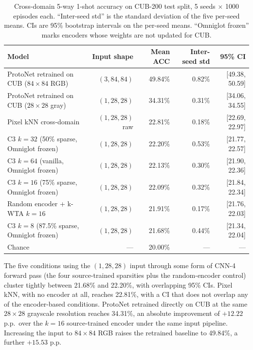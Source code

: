 \documentclass[11pt]{article}
\begin{document}
\begin{table}[tbp]
\centering
\small
\caption{Cross-domain 5-way 1-shot accuracy on CUB-200 test split, 5 seeds $\times$ 1000 episodes each. ``Inter-seed std'' is the standard deviation of the five per-seed means. CIs are 95\% bootstrap intervals on the per-seed means. ``Omniglot frozen'' marks encoders whose weights are not updated for CUB.}
\label{tab:main}
\begin{tabular}{lrrrr}
\toprule
Model & Input shape & Mean ACC & Inter-seed std & 95\% CI \\
\midrule
ProtoNet retrained on CUB ($84 \times 84$ RGB)            & $(3, 84, 84)$  & 49.84\% & 0.82\% & [49.38, 50.59] \\
ProtoNet retrained on CUB ($28 \times 28$ gray)           & $(1, 28, 28)$  & 34.31\% & 0.31\% & [34.06, 34.55] \\
Pixel kNN cross-domain                                    & $(1, 28, 28)$ raw & 22.81\% & 0.18\% & [22.69, 22.97] \\
C3 $k=32$ (50\% sparse, Omniglot frozen)                  & $(1, 28, 28)$  & 22.20\% & 0.53\% & [21.77, 22.57] \\
C3 $k=64$ (vanilla, Omniglot frozen)                      & $(1, 28, 28)$  & 22.13\% & 0.30\% & [21.90, 22.36] \\
C3 $k=16$ (75\% sparse, Omniglot frozen)                  & $(1, 28, 28)$  & 22.09\% & 0.32\% & [21.84, 22.34] \\
Random encoder + k-WTA $k=16$                             & $(1, 28, 28)$  & 21.91\% & 0.17\% & [21.76, 22.03] \\
C3 $k=8$ (87.5\% sparse, Omniglot frozen)                 & $(1, 28, 28)$  & 21.68\% & 0.44\% & [21.34, 22.04] \\
\midrule
Chance                                                    & ---            & 20.00\% & ---    & --- \\
\bottomrule
\end{tabular}
\end{table}

The five conditions using the $(1, 28, 28)$ input through some form of CNN-4 forward pass (the four source-trained sparsities plus the random-encoder control) cluster tightly between 21.68\% and 22.20\%, with overlapping 95\% CIs. Pixel kNN, with no encoder at all, reaches 22.81\%, with a CI that does not overlap any of the encoder-based conditions. ProtoNet retrained directly on CUB at the same $28 \times 28$ grayscale resolution reaches 34.31\%, an absolute improvement of $+12.22$ p.p.\ over the $k=16$ source-trained encoder under the same input pipeline. Increasing the input to $84 \times 84$ RGB raises the retrained baseline to 49.84\%, a further $+15.53$ p.p.
\end{document}
